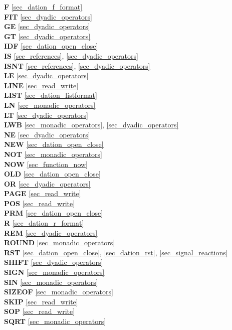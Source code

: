 {{\bf F} \ref{sec_dation_f_format}\\
{\bf FIT} \ref{sec_dyadic_operators}\\
 
{\bf GE} \ref{sec_dyadic_operators}\\
{\bf GT} \ref{sec_dyadic_operators}\\
 
{\bf IDF} \ref{sec_dation_open_close}\\
{\bf IS} \ref{sec_references}, \ref{sec_dyadic_operators}\\
{\bf ISNT} \ref{sec_references}, \ref{sec_dyadic_operators}\\

 
{\bf LE} \ref{sec_dyadic_operators}\\
{\bf LINE} \ref{sec_read_write}\\
{\bf LIST} \ref{sec_dation_listformat}\\
{\bf LN} \ref{sec_monadic_operators}\\
{\bf LT} \ref{sec_dyadic_operators}\\
{\bf LWB} \ref{sec_monadic_operators}, \ref{sec_dyadic_operators}\\
 
{\bf NE} \ref{sec_dyadic_operators}\\
{\bf NEW} \ref{sec_dation_open_close}\\
{\bf NOT} \ref{sec_monadic_operators}\\
{\bf NOW} \ref{sec_function_now}\\
 
{\bf OLD} \ref{sec_dation_open_close}\\
{\bf OR} \ref{sec_dyadic_operators}\\
 
{\bf PAGE} \ref{sec_read_write}\\
{\bf POS} \ref{sec_read_write}\\
{\bf PRM} \ref{sec_dation_open_close}\\
 
{\bf R} \ref{sec_dation_r_format}\\
{\bf REM} \ref{sec_dyadic_operators}\\
{\bf ROUND} \ref{sec_monadic_operators}\\
{\bf RST} \ref{sec_dation_open_close}, \ref{sec_dation_rst},
   \ref{sec_signal_reactions} \\
 
{\bf SHIFT} \ref{sec_dyadic_operators}\\
{\bf SIGN} \ref{sec_monadic_operators}\\
{\bf SIN} \ref{sec_monadic_operators}\\
{\bf SIZEOF} \ref{sec_monadic_operators}\\
{\bf SKIP} \ref{sec_read_write} \\
{\bf SOP}  \ref{sec_read_write}\\
{\bf SQRT} \ref{sec_monadic_operators}\\
 
}
